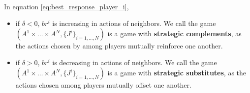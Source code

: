 \begin{remark}
In equation \eqref{eq:best_response_player_i},
\begin{itemize}
	\item if $\delta <0$, $br^i$ is increasing in actions of neighbors. We call the game $(A^{1} \times \ldots \times A^{N}, \{J^{i} \}_{i=1,\ldots,N})$ is a game with \textbf{strategic complements}, as the actions chosen by among players mutually reinforce one another.
	\item if $\delta >0$, $br^{i}$ is decreasing in actions of neighbors. We call the game  $(A^{1} \times \ldots \times A^{N}, \{J^{i} \}_{i=1,\ldots,N})$ is a game with \textbf{strategic substitutes}, as the actions chosen among players mutually offset one another.
\end{itemize}
\end{remark}


